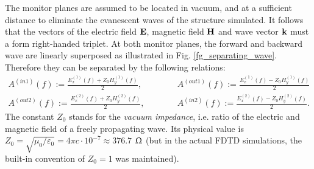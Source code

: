 The monitor planes are assumed to be located in vacuum, and at a sufficient distance to eliminate the evanescent waves of the structure simulated. It follows that the vectors of the electric field $\mathbf{E}$, magnetic field $\mathbf{H}$ and wave vector ${\mathbf{k}}$ must a form right-handed triplet. %
At both monitor planes, the forward and backward wave are linearly superposed as illustrated in Fig. \ref{fg_separating_wave}. Therefore they can be separated by the following relations: 
\begin{equation} 
	\begin{split}
		A^{(in 1)}(f)  := \frac{E_{x}^{(1)}(f) + Z_0 H_{y}^{(1)}(f)}{2}, \quad \quad \quad & A^{(out 1)}(f) := \frac{E_{x}^{(1)}(f) - Z_0 H_{y}^{(1)}(f)}{2}\\
		A^{(out 2)}(f) := \frac{E_{x}^{(2)}(f) + Z_0 H_{y}^{(2)}(f)}{2}, \quad \quad \quad & A^{(in 2)}(f)  := \frac{E_{x}^{(2)}(f) - Z_0 H_{y}^{(2)}(f)}{2}. 
	\end{split} 
\label{eq_separate_ampli}\end{equation}
The constant $Z_0$ stands for the \textit{vacuum impedance}, i.e. ratio of the electric and magnetic field of a freely propagating wave. Its physical value is $Z_0 = \sqrt{\mu_0/\varepsilon_0} = 4\pi c \cdot 10^{-7} \approx 376.7$ $\Upomega$ (but in the actual FDTD simulations, the built-in convention of $Z_0 = 1$ was maintained).

